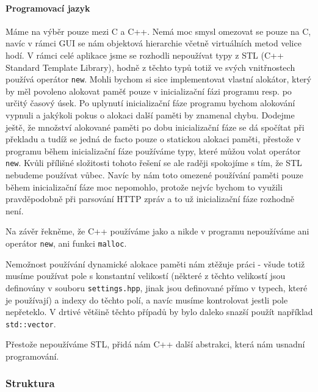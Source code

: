 \paragraph{Programovací jazyk}
Máme na výběr pouze mezi C a C++.
Nemá moc smysl omezovat se pouze na C, navíc v rámci GUI se nám objektová hierarchie včetně
virtuálních metod velice hodí.
V rámci celé aplikace jsme se rozhodli nepoužívat typy z STL (C++ Standard Template Library), hodně z
těchto typů totiž ve svých vnitřnostech používá operátor \texttt{new}.
Mohli bychom si sice implementovat vlastní alokátor, který by měl povoleno alokovat paměť pouze
v inicializační fázi programu resp. po určitý časový úsek.
Po uplynutí inicializační fáze programu bychom alokování vypnuli a jakýkoli pokus o alokaci další
paměti by znamenal chybu.
Dodejme ještě, že množství alokované paměti po dobu inicializační fáze se dá spočítat při překladu
a tudíž se jedná de facto pouze o statickou alokaci paměti, přestože v programu během inicializační
fáze používáme typy, které můžou volat operátor \texttt{new}.
Kvůli přílišné složitosti tohoto řešení se ale raději spokojíme s tím, že STL nebudeme používat vůbec.
Navíc by nám toto omezené používání  paměti pouze během inicializační fáze
moc nepomohlo, protože nejvíc bychom to využili pravděpodobně při parsování HTTP zpráv a to už
inicializační fáze rozhodně není.

Na závěr řekněme, že C++ používáme jako  a nikde v programu nepoužíváme ani operátor
\texttt{new}, ani funkci \texttt{malloc}.

Nemožnost používání dynamické alokace paměti nám ztěžuje práci - všude totiž musíme používat pole s
konstantní velikostí (některé z těchto velikostí jsou definovány v souboru \texttt{settings.hpp}, jinak
jsou definované přímo v typech, které je používají) a indexy do těchto polí, a navíc musíme kontrolovat
jestli pole nepřeteklo.
V drtivé většině těchto případů by bylo daleko snazší použít například \texttt{std::vector}.

Přestože nepoužíváme STL, přidá nám C++ další abstrakci, která nám u\-snad\-ní programování.

\subsubsection{Struktura}

